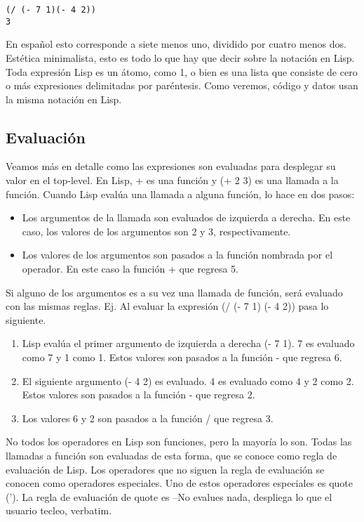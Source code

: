\documentclass[11pt]{article}
\begin{document}
\begin{verbatim}
(/ (- 7 1)(- 4 2))
3
\end{verbatim}

En español esto corresponde a siete menos uno, dividido por cuatro
menos dos.  Estética minimalista, esto es todo lo que hay que decir
sobre la notación en Lisp. Toda expresión Lisp es un átomo, como 1, o
bien es una lista que consiste de cero o más expresiones delimitadas
por paréntesis. Como veremos, código y datos usan la misma notación en
Lisp.

\subsection*{Evaluación}
\label{sec:org2318d71}

Veamos más en detalle como las expresiones son evaluadas para
desplegar su valor en el top-level. En Lisp, + es una función y (+
2 3) es una llamada a la función. Cuando Lisp evalúa una llamada a
alguna función, lo hace en dos pasos:

\begin{itemize}
\item Los argumentos de la llamada son evaluados de izquierda a derecha.
En este caso, los valores de los argumentos son 2 y 3,
respectivamente.

\item Los valores de los argumentos son pasados a la función nombrada por
el operador. En este caso la función + que regresa 5.
\end{itemize}

Si alguno de los argumentos es a su vez una llamada de función, será
evaluado con las mismas reglas. Ej. Al evaluar la expresión (/ (- 7 1) (- 4 2))
pasa lo siguiente.

\begin{enumerate}
\item Lisp evalúa el primer argumento de izquierda a derecha (- 7 1). 7 es
evaluado como 7 y 1 como 1. Estos valores son pasados a la función -
que regresa 6.
\item El siguiente argumento (- 4 2) es evaluado. 4 es evaluado como 4 y 2
como 2. Estos valores son pasados a la función - que regresa 2.
\item Los valores 6 y 2 son pasados a la función / que regresa 3.
\end{enumerate}


No todos los operadores en Lisp son funciones, pero la mayoría lo son.
Todas las llamadas a función son evaluadas de esta forma, que se conoce
como regla de evaluación de Lisp. Los operadores que no siguen la regla de
evaluación se conocen como operadores especiales. Uno de estos operadores
especiales es quote (’). La regla de evaluación de quote es –No evalues nada,
despliega lo que el usuario tecleo, verbatim. 
\end{document}
